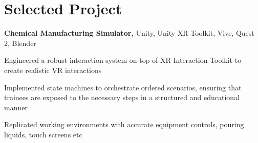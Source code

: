 \vspace{5 pt - 0.3 cm}
\section{Selected Project}
\begin{onecolentry}
\textbf{Chemical Manufacturing Simulator,} Unity, Unity XR Toolkit, Vive, Quest 2, Blender 
\end{onecolentry}

\vspace{0.10 cm}
\begin{onecolentry}
    \begin{highlights}
        \item Engineered a robust interaction system on top of XR Interaction Toolkit to create realistic VR interactions 
        \item Implemented state machines to orchestrate ordered scenarios, ensuring that trainees are exposed to the necessary steps in a structured and educational manner
        \item Replicated working environments with accurate equipment controls, pouring liquids, touch screens etc
    \end{highlights}
\end{onecolentry}   